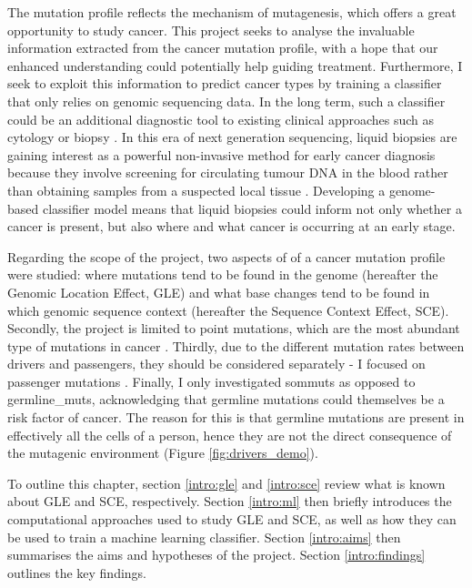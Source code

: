 

The mutation profile reflects the mechanism of mutagenesis, which offers a great opportunity to study cancer. This project seeks to analyse the invaluable information extracted from the cancer mutation profile, with a hope that our enhanced understanding could potentially help guiding treatment. Furthermore, I seek to exploit this information to predict cancer types by training a \gls{classifier} that only relies on genomic sequencing data. In the long term, such a classifier could be an additional diagnostic tool to existing clinical approaches such as cytology or biopsy \citep{Stone1995Biopsy:Pitfalls}. In this era of next generation sequencing, liquid biopsies are gaining interest as a powerful non-invasive method for early cancer diagnosis because they involve screening for circulating tumour DNA in the blood rather than obtaining samples from a suspected local tissue \citep{Chen2019Next-generationDetection}. Developing a genome-based classifier model means that liquid biopsies could inform not only whether a cancer is present, but also where and what cancer is occurring at an early stage.  

Regarding the scope of the project, two aspects of of a cancer mutation profile were studied: where mutations tend to be found in the genome (hereafter the Genomic Location Effect, GLE) and what \gls{base} changes tend to be found in which genomic sequence context (hereafter the Sequence Context Effect, SCE). Secondly, the project is limited to point mutations, which are the most abundant type of mutations in cancer \citep{Alexandrov2020}. Thirdly, due to the different mutation rates between drivers and passengers, they should be considered separately - I focused on passenger mutations \citep{McFarland2014Tug-of-warProcesses}. Finally, I only investigated \glspl{sommut} as opposed to \glspl{germline_mut}, acknowledging that germline mutations could themselves be a risk factor of cancer. The reason for this is that germline mutations are present in effectively all the cells of a person, hence they are not the direct consequence of the mutagenic environment (Figure \ref{fig:drivers_demo}). 

To outline this chapter, section \ref{intro:gle} and \ref{intro:sce} review what is known about GLE and SCE, respectively. Section \ref{intro:ml} then briefly introduces the computational approaches used to study GLE and SCE, as well as how they can be used to train a machine learning classifier. Section \ref{intro:aims} then summarises the aims and hypotheses of the project. Section \ref{intro:findings} outlines the key findings.

